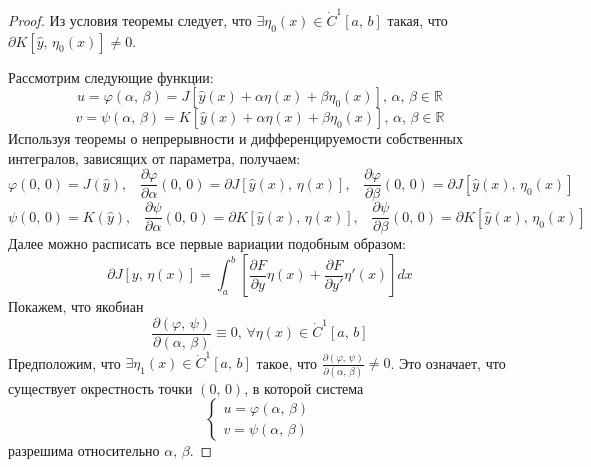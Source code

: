 \documentclass[a4paper,12pt]{article}
\renewcommand{\phi}{\ensuremath{\varphi}}
\theoremstyle{plain}
\theoremstyle{definition}
\theoremstyle{remark}
\begin{document}
\begin{proof}
	Из условия теоремы следует, что $\exists \eta_0(x) \in \dot{C}^1[a,\,b]$ такая, что $\partial K[\hat{y},\, \eta_0(x)] \neq 0$.

	Рассмотрим следующие функции:
	\[u = \phi(\alpha,\, \beta) = J[\hat{y}(x) + \alpha\eta(x) + \beta\eta_0(x)],\, \alpha,\,\beta \in \mathbb{R}\]
	\[v = \psi(\alpha,\, \beta) = K[\hat{y}(x) + \alpha\eta(x) + \beta\eta_0(x)],\, \alpha,\,\beta \in \mathbb{R}\]
	Используя теоремы о непрерывности и дифференцируемости собственных интегралов, зависящих от параметра, получаем:
	\[\phi(0,\,0) = J(\hat{y}),\;\;\; \frac{\partial \phi}{\partial \alpha}(0,\,0) = \partial J[\hat{y}(x),\, \eta(x)],\;\;\; \frac{\partial \phi}{\partial \beta}(0,\,0) = \partial J[\hat{y}(x),\, \eta_0(x)]\]
	\[\psi(0,\,0) = K(\hat{y}),\;\;\; \frac{\partial \psi}{\partial \alpha}(0,\,0) = \partial K[\hat{y}(x),\, \eta(x)],\;\;\; \frac{\partial \psi}{\partial \beta}(0,\,0) = \partial K[\hat{y}(x),\, \eta_0(x)]\]
	Далее можно расписать все первые вариации подобным образом:
	\[\partial J[y,\, \eta(x)] = \int_a^b \left[\frac{\partial F}{\partial y}\eta(x) + \frac{\partial F}{\partial y'}\eta'(x)\right]dx\]
	Покажем, что якобиан
	\[\frac{\partial(\phi,\, \psi)}{\partial(\alpha,\, \beta)} \equiv 0,\, \forall \eta(x) \in \dot{C}^1[a,\,b]\]
	Предположим, что $\exists \eta_1(x) \in \dot{C}^1[a,\,b]$ такое, что $\frac{\partial(\phi,\, \psi)}{\partial(\alpha,\, \beta)} \neq 0$. Это означает, что существует окрестность точки $(0,\,0)$, в которой система
	\[\begin{cases}
			u = \phi(\alpha,\, \beta) \\
			v = \psi(\alpha,\, \beta)
		\end{cases}\]
	разрешима относительно $\alpha,\, \beta$.


\end{proof}
\end{document}
